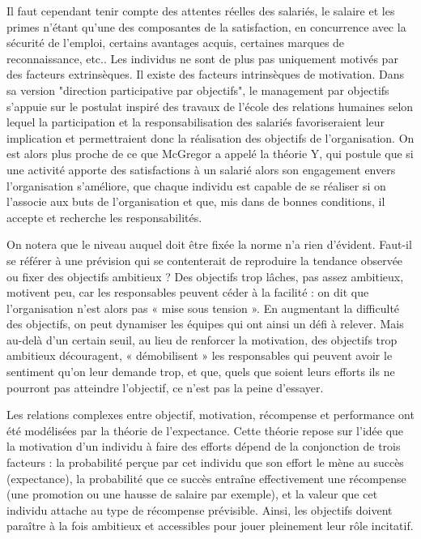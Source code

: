 \documentclass[oneside]{kaobook}
\begin{document}
Il faut cependant tenir compte des attentes réelles des salariés, le salaire et les primes n’étant qu’une des composantes de la satisfaction, en concurrence avec la sécurité de l’emploi, certains avantages acquis, certaines marques de reconnaissance, etc.. Les individus ne sont de plus pas uniquement motivés par des facteurs extrinsèques. Il existe des facteurs intrinsèques de motivation. Dans sa version "direction participative par objectifs",  le management par objectifs s’appuie sur le postulat inspiré des travaux de l’école des relations humaines selon lequel la participation et la responsabilisation des salariés favoriseraient leur implication et permettraient donc la réalisation des objectifs de l’organisation. On est alors plus proche de ce que McGregor a appelé la théorie Y, qui postule que si une activité apporte des satisfactions à un salarié alors son engagement envers l'organisation s'améliore, que chaque individu est capable de se réaliser si on l'associe aux buts de l'organisation et que, mis dans de bonnes conditions, il accepte et recherche les responsabilités.

\begin{kaobox}
On notera que le niveau auquel doit être fixée la norme n’a rien d’évident. Faut-il se référer à une prévision qui se contenterait de reproduire la tendance observée ou fixer des objectifs ambitieux ? Des objectifs trop lâches, pas assez ambitieux, motivent peu, car les responsables peuvent céder à la facilité : on dit que l’organisation n’est alors pas « mise sous tension ». En augmentant la difficulté des objectifs, on peut dynamiser les équipes qui ont ainsi un défi à relever. Mais au-delà d’un certain seuil, au lieu de renforcer la motivation, des objectifs trop ambitieux découragent, « démobilisent » les responsables qui peuvent avoir le sentiment qu’on leur demande trop, et que, quels que soient leurs efforts ils ne pourront pas atteindre l’objectif, ce n’est pas la peine d’essayer.

Les relations complexes entre objectif, motivation, récompense et performance ont été modélisées par la théorie de l’expectance. Cette théorie repose sur l’idée que la motivation d’un individu à faire des efforts dépend de la conjonction de trois facteurs : la probabilité perçue par cet individu que son effort le mène au succès (expectance), la probabilité que ce succès entraîne effectivement une récompense (une promotion ou une hausse de salaire par exemple), et la valeur que cet individu attache au type de récompense prévisible. Ainsi, les objectifs doivent paraître à la fois ambitieux et accessibles pour jouer pleinement leur rôle incitatif. 
\end{kaobox}
\end{document}
